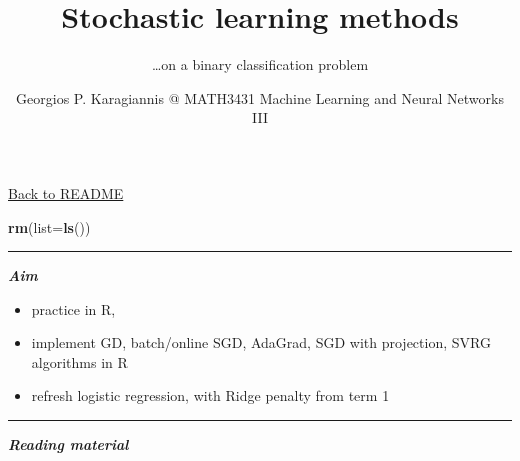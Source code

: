 \documentclass[
]{article}
\title{Stochastic learning methods}
\subtitle{\ldots on a binary classification problem}
\author{Georgios P. Karagiannis @ MATH3431 Machine Learning and Neural
Networks III}
\date{}
\newenvironment{Shaded}{\begin{snugshade}}{\end{snugshade}}
\newcommand{\DataTypeTok}[1]{\textcolor[rgb]{0.13,0.29,0.53}{#1}}
\newcommand{\KeywordTok}[1]{\textcolor[rgb]{0.13,0.29,0.53}{\textbf{#1}}}
\newcommand{\NormalTok}[1]{#1}
\begin{document}
\maketitle

\href{https://github.com/georgios-stats/Machine_Learning_and_Neural_Networks_III_Epiphany_2023/tree/main/Computer_practical\#aim}{Back
to README}

\begin{Shaded}
\begin{Highlighting}[]
\KeywordTok{rm}\NormalTok{(}\DataTypeTok{list=}\KeywordTok{ls}\NormalTok{())}
\end{Highlighting}
\end{Shaded}

\begin{center}\rule{0.5\linewidth}{0.5pt}\end{center}

\textbf{\emph{Aim}}

\begin{itemize}
\item
  practice in R,
\item
  implement GD, batch/online SGD, AdaGrad, SGD with projection, SVRG
  algorithms in R
\item
  refresh logistic regression, with Ridge penalty from term 1
\end{itemize}

\begin{center}\rule{0.5\linewidth}{0.5pt}\end{center}

\textbf{\emph{Reading material}}
\end{document}
